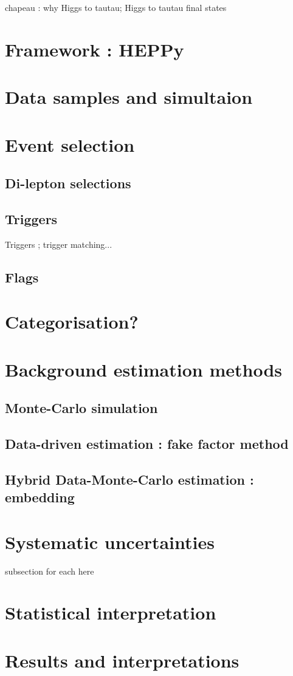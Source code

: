 chapeau : why Higgs to tautau; Higgs to tautau final states

\section{Framework : HEPPy}

\section{Data samples and simultaion}

\section{Event selection}

\subsection{Di-lepton selections}

\subsection{Triggers}

Triggers ; trigger matching...

\subsection{Flags}

\section{Categorisation?}

\section{Background estimation methods}

\subsection{Monte-Carlo simulation}

\subsection{Data-driven estimation : fake factor method}

\subsection{Hybrid Data-Monte-Carlo estimation : embedding}

\section{Systematic uncertainties}

subsection for each here

\section{Statistical interpretation}

\section{Results and interpretations}